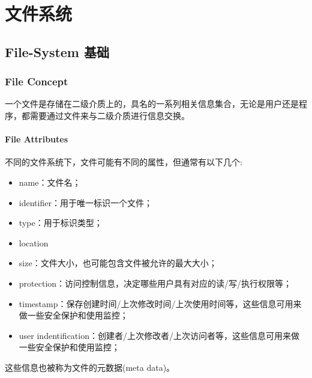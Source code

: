 \section{文件系统}
\subsection{File-System 基础}

\subsubsection{File Concept}
一个文件是存储在二级介质上的，具名的一系列相关信息集合，无论是用户还是程序，都需要通过文件来与二级介质进行信息交换。

\paragraph{File Attributes}
不同的文件系统下，文件可能有不同的属性，但通常有以下几个:
\begin{itemize}\small
    \item name：文件名；
    \item identifier：用于唯一标识一个文件；
    \item type：用于标识类型；
    \item location
    \item size：文件大小，也可能包含文件被允许的最大大小；
    \item protection：访问控制信息，决定哪些用户具有对应的读/写/执行权限等；
    \item timestamp：保存创建时间/上次修改时间/上次使用时间等，这些信息可用来做一些安全保护和使用监控；
    \item user indentification：创建者/上次修改者/上次访问者等，这些信息可用来做一些安全保护和使用监控；
\end{itemize}
这些信息也被称为文件的元数据(meta data)。


